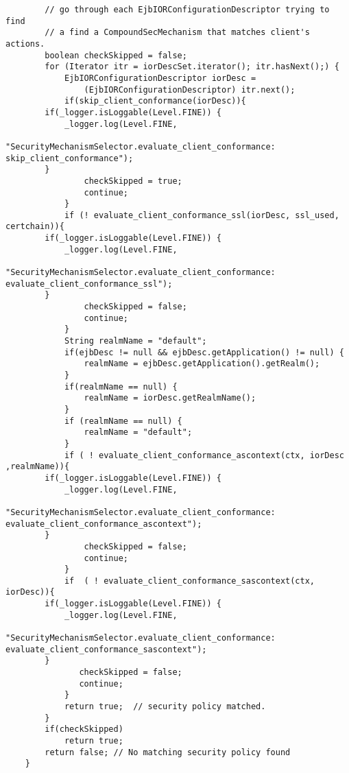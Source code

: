 \begin{lstlisting}
        // go through each EjbIORConfigurationDescriptor trying to find
        // a find a CompoundSecMechanism that matches client's actions.
        boolean checkSkipped = false;
        for (Iterator itr = iorDescSet.iterator(); itr.hasNext();) {
            EjbIORConfigurationDescriptor iorDesc = 
                (EjbIORConfigurationDescriptor) itr.next();
            if(skip_client_conformance(iorDesc)){
		if(_logger.isLoggable(Level.FINE)) {
		    _logger.log(Level.FINE,
				"SecurityMechanismSelector.evaluate_client_conformance: skip_client_conformance");
		}
                checkSkipped = true;
                continue;
            }
            if (! evaluate_client_conformance_ssl(iorDesc, ssl_used, certchain)){
		if(_logger.isLoggable(Level.FINE)) {
		    _logger.log(Level.FINE,
				"SecurityMechanismSelector.evaluate_client_conformance: evaluate_client_conformance_ssl");
		}
                checkSkipped = false;
                continue;
            }
            String realmName = "default";
            if(ejbDesc != null && ejbDesc.getApplication() != null) {
                realmName = ejbDesc.getApplication().getRealm();
            }
            if(realmName == null) {
                realmName = iorDesc.getRealmName();
            }
            if (realmName == null) {
                realmName = "default";
            }
            if ( ! evaluate_client_conformance_ascontext(ctx, iorDesc ,realmName)){
		if(_logger.isLoggable(Level.FINE)) {
		    _logger.log(Level.FINE,
				"SecurityMechanismSelector.evaluate_client_conformance: evaluate_client_conformance_ascontext");
		}
                checkSkipped = false;
                continue;
            }
            if  ( ! evaluate_client_conformance_sascontext(ctx, iorDesc)){
		if(_logger.isLoggable(Level.FINE)) {
		    _logger.log(Level.FINE,
				"SecurityMechanismSelector.evaluate_client_conformance: evaluate_client_conformance_sascontext");
		}
               checkSkipped = false;
               continue;
            }
            return true;  // security policy matched.
        }
        if(checkSkipped)
            return true;
        return false; // No matching security policy found
    }
\end{lstlisting}




